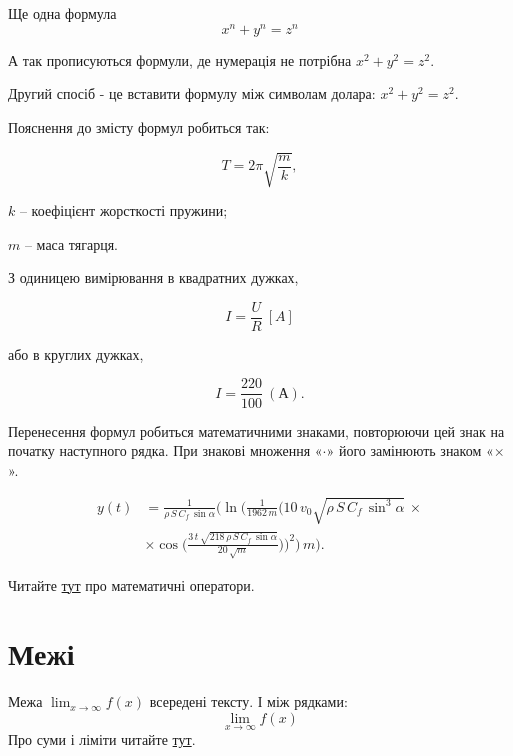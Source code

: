 Ще одна формула    
\begin{equation}
    x^n + y^n = z^n
\end{equation}
    
А так прописуються формули, де нумерація не потрібна \(x^2 + y^2 = z^2\).

Другий спосіб - це вставити формулу між символам долара: $x^2 + y^2 = z^2$. 

Пояснення до змісту формул робиться так:

\begin{equation}
T = 2\pi\sqrt{\frac{m}{k}}, 
\end{equation}

\begin{explanation}
\fitem $k$ -- коефіцієнт жорсткості пружини; 
\item $m$ -- маса тягарця.
\end{explanation}

З одиницею вимірювання в квадратних дужках,

\begin{equation}
\label{eq:explan}
I = \frac{U}{R}~[A]
\end{equation}

або в круглих дужках,

$$I = \frac{220}{100}~(\text{А}).$$

Перенесення формул робиться математичними знаками, повторюючи цей знак на початку наступного рядка. При знакові множення «$\cdot$» його замінюють знаком «$\times$».

\begin{align}
\label{xt:eq}
y(t) &= \frac{1}{{\rho}\,{S}\,{C_{f}}\,\sin\alpha}\Big(\ln\Big(\frac{1}{1962\,m}\Big(10\,v_0\sqrt{\rho\,S\,C_f\,\sin^3\alpha}\,\times \nonumber\\  &\times\cos\Big(\frac{3\,t\,\sqrt{218\,\rho\,S\,C_f\,\sin\alpha}}{20\,\sqrt{m}}\Big)\Big)^2\Big)\,m\Big).
\end{align}

Читайте \href{https://www.overleaf.com/learn/latex/Operators}{тут} про математичні оператори.

\section{Межі}
    
    Межа \(\lim_{x\to\infty} f(x)\) всередені тексту.
    І між рядками:
    \[
    \lim_{x\to\infty} f(x)
    \]
Про суми і ліміти читайте 
\href{https://www.overleaf.com/learn/latex/Integrals,_sums_and_limits#Sums_and_products}{тут}.


